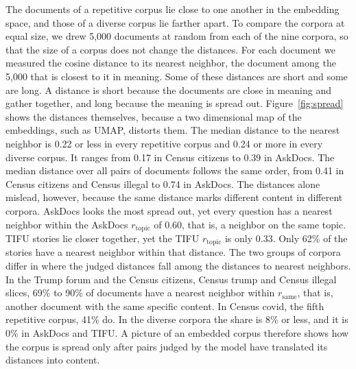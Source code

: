 
The documents of a repetitive corpus lie close to one another in the embedding space, and those of a diverse corpus lie farther apart. To compare the corpora at equal size, we drew 5{,}000 documents at random from each of the nine corpora, so that the size of a corpus does not change the distances. For each document we measured the cosine distance to its nearest neighbor, the document among the 5{,}000 that is closest to it in meaning. Some of these distances are short and some are long. A distance is short because the documents are close in meaning and gather together, and long because the meaning is spread out. Figure~\ref{fig:spread} shows the distances themselves, because a two dimensional map of the embeddings, such as UMAP, distorts them. The median distance to the nearest neighbor is 0.22 or less in every repetitive corpus and 0.24 or more in every diverse corpus. It ranges from 0.17 in Census citizens to 0.39 in AskDocs. The median distance over all pairs of documents follows the same order, from 0.41 in Census citizens and Census illegal to 0.74 in AskDocs. The distances alone mislead, however, because the same distance marks different content in different corpora. AskDocs looks the most spread out, yet every question has a nearest neighbor within the AskDocs $r_{\mathrm{topic}}$ of 0.60, that is, a neighbor on the same topic. TIFU stories lie closer together, yet the TIFU $r_{\mathrm{topic}}$ is only 0.33. Only 62\% of the stories have a nearest neighbor within that distance. The two groups of corpora differ in where the judged distances fall among the distances to nearest neighbors. In the Trump forum and the Census citizens, Census trump and Census illegal slices, 69\% to 90\% of documents have a nearest neighbor within $r_{\mathrm{same}}$, that is, another document with the same specific content. In Census covid, the fifth repetitive corpus, 41\% do. In the diverse corpora the share is 8\% or less, and it is 0\% in AskDocs and TIFU. A picture of an embedded corpus therefore shows how the corpus is spread only after pairs judged by the model have translated its distances into content.

\caption{Distances to the nearest neighbor in nine corpora, for 5{,}000 documents drawn at random from each corpus. Each row is one corpus, and the rows are ordered by the median distance. The violin shows the cosine distances from each document to its nearest neighbor, with the middle half as a thick bar and the median as a white tick. The filled diamond marks $r_{\mathrm{same}}$ and the open diamond marks $r_{\mathrm{topic}}$. Census citizens has no open diamond, because every judged pair closer than 0.4 shares at least a topic. The number on the right is the percentage of documents whose nearest neighbor lies within $r_{\mathrm{same}}$.}
